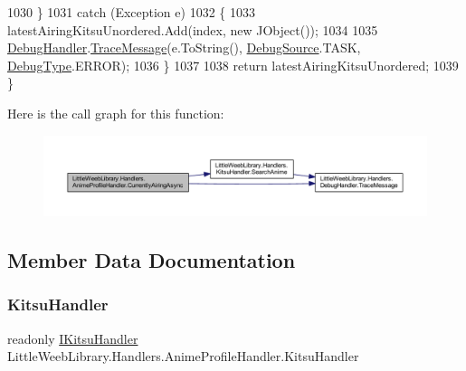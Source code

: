 \begin{DoxyCode}
1030             \}
1031             \textcolor{keywordflow}{catch} (Exception e)
1032             \{
1033                 latestAiringKitsuUnordered.Add(index, \textcolor{keyword}{new} JObject());
1034 
1035                 \mbox{\hyperlink{class_little_weeb_library_1_1_handlers_1_1_anime_profile_handler_a0b0ae3c3838d26351485e6dfc566a632}{DebugHandler}}.\mbox{\hyperlink{interface_little_weeb_library_1_1_handlers_1_1_i_debug_handler_a2e405bc3492e683cd3702fae125221bc}{TraceMessage}}(e.ToString(), 
      \mbox{\hyperlink{namespace_little_weeb_library_1_1_handlers_a2a6ca0775121c9c503d58aa254d292be}{DebugSource}}.TASK, \mbox{\hyperlink{namespace_little_weeb_library_1_1_handlers_ab66019ed40462876ec4e61bb3ccb0a62}{DebugType}}.ERROR);
1036             \}
1037 
1038             \textcolor{keywordflow}{return} latestAiringKitsuUnordered;
1039         \}
\end{DoxyCode}
Here is the call graph for this function\+:\nopagebreak
\begin{figure}[H]
\begin{center}
\leavevmode
\includegraphics[width=350pt]{class_little_weeb_library_1_1_handlers_1_1_anime_profile_handler_a11b3560a1e2fe0e3ac5d481efb46d7a6_cgraph}
\end{center}
\end{figure}


\subsection{Member Data Documentation}
\mbox{\label{class_little_weeb_library_1_1_handlers_1_1_anime_profile_handler_adf3e37895c7834c51b436beed19d1aa5}} 
\subsubsection{\texorpdfstring{Kitsu\+Handler}{KitsuHandler}}
{\footnotesize\ttfamily readonly \mbox{\hyperlink{interface_little_weeb_library_1_1_handlers_1_1_i_kitsu_handler}{I\+Kitsu\+Handler}} Little\+Weeb\+Library.\+Handlers.\+Anime\+Profile\+Handler.\+Kitsu\+Handler\hspace{0.3cm}{\ttfamily [private]}}



